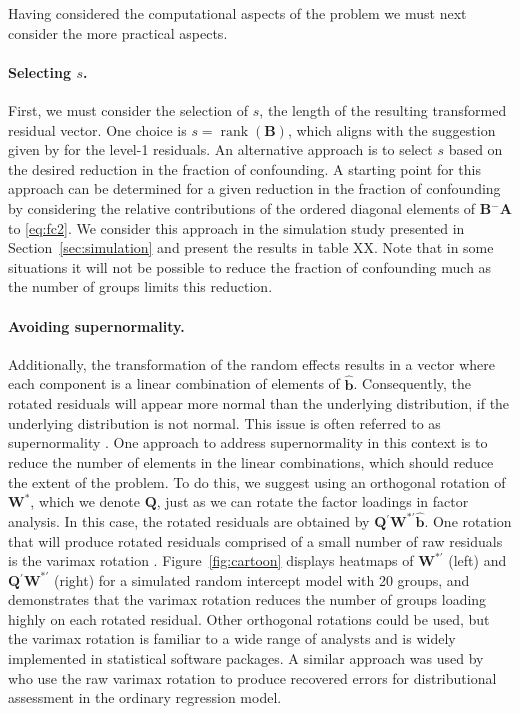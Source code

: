 \documentclass[12pt]{article} %
\newcommand{\al}[1]{{\color{red} #1}}
\newcommand{\ginv}{\ensuremath{^{-}}}
\newcommand{\trans}{\ensuremath{^\prime}}
\DeclareMathOperator{\rank}{rank}
\begin{document}
Having considered the computational aspects of the problem we must next consider the more practical aspects. 

\paragraph{Selecting $s$.}
First, we must consider the selection of $s$,  the length of the resulting transformed residual vector. One choice is $s = \rank(\bm{B})$, which aligns with the suggestion given by \cite{HildenMinton:1995wh} for the level-1 residuals. 
An alternative approach is to select $s$ based on the desired reduction in the fraction of confounding. A starting point for this approach can be determined for a given reduction in the fraction of confounding by considering the relative contributions of the ordered diagonal elements of $\bm{B}\ginv\bm{A}$ to \eqref{eq:fc2}. We consider this approach in the simulation study presented in Section~\ref{sec:simulation} and present the results in table XX. Note that in some situations it will not be possible to reduce the fraction of confounding much as the number of groups limits this reduction.

\paragraph{Avoiding supernormality.}
Additionally, the transformation of the random effects results in a vector where each component is a linear combination of elements of $\widehat{\bm{b}}$. Consequently, the rotated residuals will appear more normal than the underlying distribution, if the underlying distribution is not normal. This issue is often referred to as supernormality \citep{Atkinson:1985}. One approach to address supernormality in this context is to reduce the number of elements in the linear combinations, which should reduce the extent of the problem. To do this, we suggest using an orthogonal rotation of $\bm{W}^*$, which we denote $\bm{Q}$, just as we can rotate the factor loadings in factor analysis. In this case, the rotated residuals are obtained by $\bm{Q}\trans \bm{W}^{*\prime} \widehat{\bm{b}}$. One rotation that will produce rotated residuals comprised of a small number of raw residuals is the varimax rotation \citep{Johnson:2007}. Figure~\ref{fig:cartoon} displays heatmaps of $\bm{W}^{*\prime}$ (left) and $\bm{Q}\trans\bm{W}^{*\prime}$ (right) for a simulated random intercept model with 20 groups, and demonstrates that the varimax rotation reduces the number of groups loading highly on each rotated residual.  Other orthogonal rotations could be used, but the varimax rotation is familiar to a wide range of analysts and is widely implemented in statistical software packages. A similar approach was used by \cite{Jensen:1999iu} who use the raw varimax rotation to produce recovered errors for distributional assessment in the ordinary regression model.
\end{document}
